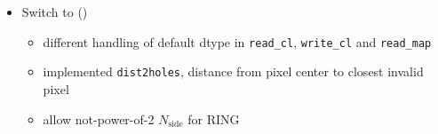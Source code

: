 \documentclass[12pt,twoside]{article}
\newcommand{\nside}{N_{\mathrm{side}}}
\begin{document}
{{%
\begin{itemize}
\item Switch to 
	()
\begin{itemize}
\item different handling of default dtype in \texttt{read\_cl}, \texttt{write\_cl} and \texttt{read\_map}
\item implemented \texttt{dist2holes}, distance from pixel center to closest invalid pixel
\item allow not-power-of-2 $\nside$ for RING
\end{itemize}
\end{itemize}
%



}}
\end{document}
